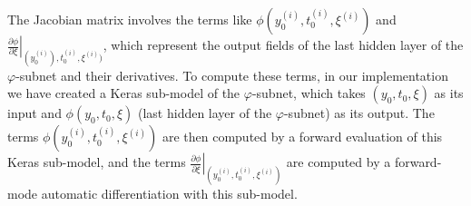 \begin{remark}\label{rem_2}
  The Jacobian matrix involves the terms like $\phi(y_0^{(i)},t_0^{(i)},\xi^{(i)})$ and
  $\left.\frac{\partial\phi}{\partial\xi}\right|_{(y_0^{(i)}),t_0^{(i)},\xi^{(i)})}$, which
  represent the output fields of the last hidden layer of
  the $\varphi$-subnet and their derivatives.
  To compute these terms,
  in our implementation we have created a Keras sub-model of the $\varphi$-subnet,
  which takes $(y_0,t_0,\xi)$ as its input
  and $\phi(y_0,t_0,\xi)$ (last hidden layer
  of the $\varphi$-subnet) as its output.
  The terms $\phi(y_0^{(i)},t_0^{(i)},\xi^{(i)})$ are then computed by a forward
  evaluation of this Keras sub-model,
  and the terms
  $\left.\frac{\partial\phi}{\partial\xi}\right|_{(y_0^{(i)},t_0^{(i)},\xi^{(i)})}$
  are computed by a forward-mode automatic differentiation with this sub-model.
  
\end{remark}

